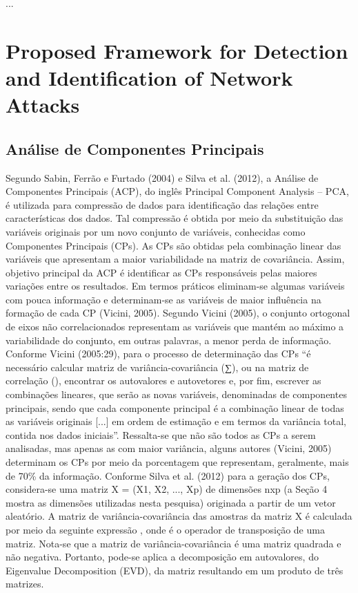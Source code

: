 ...

\section{Proposed Framework for Detection and Identification of Network Attacks}
\label{sec:prop_getv}

\subsection{Análise de Componentes Principais}

Segundo Sabin, Ferrão e Furtado (2004) e Silva et al. (2012), a Análise de Componentes Principais (ACP), do inglês Principal Component Analysis – PCA, é utilizada para compressão de dados para identificação das relações entre características dos dados. Tal compressão é obtida por meio da substituição das variáveis originais por um novo conjunto de variáveis, conhecidas como Componentes Principais (CPs). As CPs são obtidas pela combinação linear das variáveis que apresentam a maior variabilidade na matriz de covariância. Assim, objetivo principal da ACP é identificar as CPs responsáveis pelas maiores variações entre os resultados. Em termos práticos eliminam-se algumas variáveis com pouca informação e determinam-se as variáveis de maior influência na formação de cada CP (Vicini, 2005).
Segundo Vicini (2005), o conjunto ortogonal de eixos não correlacionados representam as variáveis que mantém ao máximo a variabilidade do conjunto, em outras palavras, a menor perda de informação. 
Conforme Vicini (2005:29), para o processo de determinação das CPs 
“é necessário calcular matriz de variância-covariância (∑), ou na matriz de correlação (), encontrar os autovalores e autovetores e, por fim, escrever as combinações lineares, que serão as novas variáveis, denominadas de componentes principais, sendo que cada componente principal é a combinação linear de todas as variáveis originais [...] em ordem de estimação e em termos da variância total, contida nos dados iniciais”. 
Ressalta-se que não são todos as CPs a serem analisadas, mas apenas as com maior variância, alguns autores (Vicini, 2005) determinam os CPs por meio da porcentagem que representam, geralmente, mais de 70\% da informação. 
Conforme Silva et al. (2012) para a geração dos CPs, considera-se uma matriz X = (X1, X2, ..., Xp) de dimensões nxp (a Seção 4 mostra as dimensões utilizadas nesta pesquisa) originada a partir de um vetor aleatório. A matriz de variância-covariância  das amostras da matriz X é calculada por meio da seguinte expressão , onde é o operador de transposição de uma matriz. Nota-se que a matriz de variância-covariância é uma matriz quadrada e não negativa. Portanto, pode-se aplica a decomposição em autovalores, do Eigenvalue Decomposition (EVD), da matriz  resultando em um produto de três matrizes.
